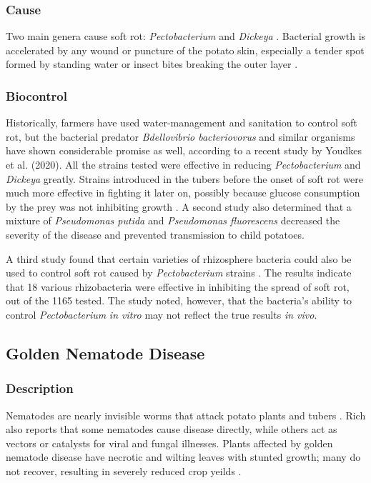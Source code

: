 \documentclass[12pt]{article}
\begin{document}
\subsubsection{Cause}

Two main genera cause soft rot: \emph{Pectobacterium} and \emph{Dickeya} \autocite{youdkes2020potential}. Bacterial growth is accelerated by any wound or puncture of the potato skin, especially a tender spot formed by standing water or insect bites breaking the outer layer \autocite{rich2013potato}.

\subsubsection{Biocontrol}

Historically, farmers have used water-management and sanitation to control soft rot, but the bacterial predator \emph{Bdellovibrio bacteriovorus} and similar organisms have shown considerable promise as well, according to a recent study by Youdkes et al. (2020). All the strains tested were effective in reducing \emph{Pectobacterium} and \emph{Dickeya} greatly. Strains introduced in the tubers before the onset of soft rot were much more effective in fighting it later on, possibly because glucose consumption by the prey was not inhibiting growth \autocite{youdkes2020potential}. A second study also determined that a mixture of \emph{Pseudomonas putida} and \emph{Pseudomonas fluorescens} decreased the severity of the disease and prevented transmission to child potatoes.

A third study found that certain varieties of rhizosphere bacteria could also be used to control soft rot caused by \emph{Pectobacterium} strains \autocite{krzyzanowska2012rhizosphere}. The results indicate that 18 various rhizobacteria were effective in inhibiting the spread of soft rot, out of the 1165 tested. The study noted, however, that the bacteria's ability to control \emph{Pectobacterium} \emph{in vitro} may not reflect the true results \emph{in vivo}.


\subsection{Golden Nematode Disease}

\subsubsection{Description}

Nematodes are nearly invisible worms that attack potato plants and tubers \autocite{rich2013potato}. Rich also reports that some nematodes cause disease directly, while others act as vectors or catalysts for viral and fungal illnesses. Plants affected by golden nematode disease have necrotic and wilting leaves with stunted growth; many do not recover, resulting in severely reduced crop yeilds \autocite{rich2013potato}.
\end{document}

